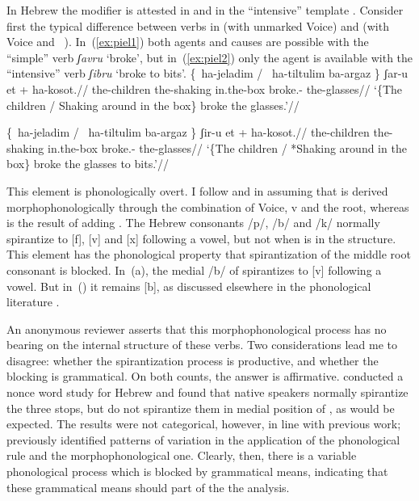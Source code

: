 In Hebrew the modifier {\va} is attested in {\thit} and in the ``intensive'' template {\tpie}. Consider first the typical difference between verbs in {\tkal} (with unmarked Voice) and {\tpie} (with Voice and \va~\!). In~(\ref{ex:piel1}) both agents and causes are possible with the ``simple'' {\tkal} verb \emph{ʃavru} `broke', but in~(\ref{ex:piel2}) only the agent is available with the ``intensive'' {\tpie} verb \emph{ʃibru} `broke to bits'.
\pex \citet[20]{doron03}
	\a \label{ex:piel1}\begingl
	\gla \{\cmark~ha-jeladim / \cmark~ha-tiltulim ba-argaz \} ʃar-u et + \phantom{\{\cmark~}ha-kosot.//
	\glb \phantom{\{\cmark~}the-children {} \phantom{\cmark~}the-shaking in.the-box {} broke.-  \phantom{\{\cmark~}the-glasses//
	\glft `\{The children / Shaking around in the box\} broke the glasses.'//
	\endgl

	\a \label{ex:piel2}\begingl
	\gla \{\cmark~ha-jeladim / \xmark~ha-tiltulim ba-argaz \} ʃir-u et + \phantom{\{\cmark~}ha-kosot.//
	\glb \phantom{\{\cmark~}the-children {} \phantom{\xmark~}the-shaking in.the-box {} broke.-  \phantom{\{\cmark~}the-glasses//
	\glft `\{The children / *Shaking around in the box\} broke the glasses to bits.'//
	\endgl
\xe

This element is phonologically overt. I follow \cite{doron03} and \cite{kastner16nllt} in assuming that {\tkal} is derived morphophonologically through the combination of Voice, v and the root, whereas {\tpie} is the result of adding {\va}. The Hebrew consonants /p/, /b/ and /k/ normally spirantize to [f], [v] and [x] following a vowel, but not when {\va} is in the structure. This element has the phonological property that spirantization of the middle root consonant is blocked. In~(\lastx a), the medial /b/ of  spirantizes to [v] following a vowel. But in~(\lastx) it remains [b], as discussed elsewhere in the phonological literature \citep{temkinmartinez08wccfl,gouskova12nllt,kastner16nllt}. 

An anonymous reviewer asserts that this morphophonological process has no bearing on the internal structure of these verbs. Two considerations lead me to disagree: whether the spirantization process is productive, and whether the blocking is grammatical. On both counts, the answer is affirmative. \cite{temkinmartinzemuellner16} conducted a nonce word study for Hebrew and found that native speakers normally spirantize the three stops, but do not spirantize them in medial position of {\tpie}, as would be expected. The results were not categorical, however, in line with previous work; \cite{adam02} previously identified patterns of variation in the application of the phonological rule and the morphophonological one. Clearly, then, there is a variable phonological process which is blocked by grammatical means, indicating that these grammatical means should part of the the analysis.

